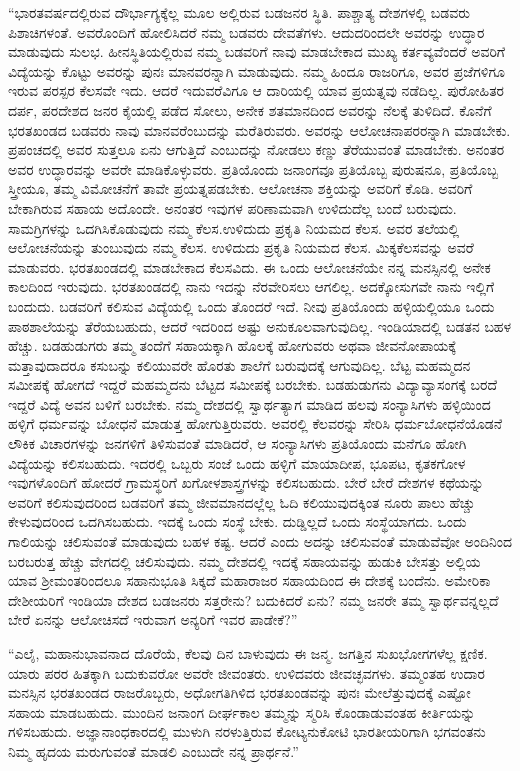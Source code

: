  “ಭಾರತವರ್ಷದಲ್ಲಿರುವ ದೌರ್ಭಾಗ್ಯಕ್ಕೆಲ್ಲ ಮೂಲ ಅಲ್ಲಿರುವ ಬಡಜನರ ಸ್ಥಿತಿ. ಪಾಶ್ಚಾತ್ಯ ದೇಶಗಳಲ್ಲಿ ಬಡವರು ಪಿಶಾಚಿಗಳಂತೆ. ಅವರೊಂದಿಗೆ ಹೋಲಿಸಿದರೆ ನಮ್ಮ ಬಡವರು ದೇವತೆಗಳು. ಆದುದರಿಂದಲೇ ಅವರನ್ನು ಉದ್ಧಾರ ಮಾಡುವುದು ಸುಲಭ. ಹೀನಸ್ಥಿತಿಯಲ್ಲಿರುವ ನಮ್ಮ ಬಡವರಿಗೆ ನಾವು ಮಾಡಬೇಕಾದ ಮುಖ್ಯ ಕರ್ತವ್ಯವೆಂದರೆ ಅವರಿಗೆ ವಿದ್ಯೆಯನ್ನು ಕೊಟ್ಟು ಅವರನ್ನು ಪುನಃ ಮಾನವರನ್ನಾಗಿ ಮಾಡುವುದು. ನಮ್ಮ ಹಿಂದೂ ರಾಜರಿಗೂ, ಅವರ ಪ್ರಜೆಗಳಿಗೂ ಇರುವ ಪರಸ್ಪರ ಕೆಲಸವೇ ಇದು. ಆದರೆ ಇದುವರೆವಿಗೂ ಆ ದಾರಿಯಲ್ಲಿ ಯಾವ ಪ್ರಯತ್ನವು ನಡೆದಿಲ್ಲ. ಪುರೋಹಿತರ ದರ್ಪ, ಪರದೇಶದ ಜನರ ಕೈಯಲ್ಲಿ ಪಡೆದ ಸೋಲು, ಅನೇಕ ಶತಮಾನದಿಂದ ಅವರನ್ನು ನೆಲಕ್ಕೆ ತುಳಿದಿದೆ. ಕೊನೆಗೆ ಭರತಖಂಡದ ಬಡವರು ನಾವು ಮಾನವರೆಂಬುದನ್ನು ಮರೆತಿರುವರು. ಅವರನ್ನು ಆಲೋಚನಾಪರರನ್ನಾಗಿ ಮಾಡಬೇಕು. ಪ್ರಪಂಚದಲ್ಲಿ ಅವರ ಸುತ್ತಲೂ ಏನು ಆಗುತ್ತಿದೆ ಎಂಬುದನ್ನು ನೋಡಲು ಕಣ್ಣು ತೆರೆಯುವಂತೆ ಮಾಡಬೇಕು. ಅನಂತರ ಅವರ ಉದ್ಧಾರವನ್ನು ಅವರೇ ಮಾಡಿಕೊಳ್ಳುವರು. ಪ್ರತಿಯೊಂದು ಜನಾಂಗವೂ ಪ್ರತಿಯೊಬ್ಬ ಪುರುಷನೂ, ಪ್ರತಿಯೊಬ್ಬ ಸ್ತ್ರೀಯೂ, ತಮ್ಮ ವಿಮೋಚನೆಗೆ ತಾವೇ ಪ್ರಯತ್ನಪಡಬೇಕು. ಆಲೋಚನಾ ಶಕ್ತಿಯನ್ನು ಅವರಿಗೆ ಕೊಡಿ. ಅವರಿಗೆ ಬೇಕಾಗಿರುವ ಸಹಾಯ ಅದೊಂದೇ. ಅನಂತರ ಇವುಗಳ ಪರಿಣಾಮವಾಗಿ ಉಳಿದುದೆಲ್ಲ ಬಂದೆ ಬರುವುದು. ಸಾಮಗ್ರಿಗಳನ್ನು ಒದಗಿಸಿಕೊಡುವುದು ನಮ್ಮ ಕೆಲಸ.\break ಉಳಿದುದು ಪ್ರಕೃತಿ ನಿಯಮದ ಕೆಲಸ. ಅವರ ತಲೆಯಲ್ಲಿ ಆಲೋಚನೆಯನ್ನು ತುಂಬುವುದು ನಮ್ಮ ಕೆಲಸ. ಉಳಿದುದು ಪ್ರಕೃತಿ ನಿಯಮದ ಕೆಲಸ. ಮಿಕ್ಕಕೆಲಸವನ್ನು ಅವರೆ ಮಾಡುವರು. ಭರತಖಂಡದಲ್ಲಿ ಮಾಡಬೇಕಾದ ಕೆಲಸವಿದು. ಈ ಒಂದು ಆಲೋಚನೆಯೇ ನನ್ನ ಮನಸ್ಸಿನಲ್ಲಿ ಅನೇಕ ಕಾಲದಿಂದ ಇರುವುದು. ಭರತಖಂಡದಲ್ಲಿ ನಾನು ಇದನ್ನು ನೆರವೇರಿಸಲು ಆಗಲಿಲ್ಲ. ಅದಕ್ಕೋಸುಗವೇ ನಾನು ಇಲ್ಲಿಗೆ ಬಂದುದು. ಬಡವರಿಗೆ ಕಲಿಸುವ ವಿದ್ಯೆಯಲ್ಲಿ ಒಂದು ತೊಂದರೆ ಇದೆ. ನೀವು ಪ್ರತಿಯೊಂದು ಹಳ್ಳಿಯಲ್ಲಿಯೂ ಒಂದು ಪಾಠಶಾಲೆಯನ್ನು ತೆರೆಯಬಹುದು, ಆದರೆ ಇದರಿಂದ ಅಷ್ಟು ಅನುಕೂಲವಾಗುವುದಿಲ್ಲ. ಇಂಡಿಯಾದಲ್ಲಿ ಬಡತನ ಬಹಳ ಹೆಚ್ಚು. ಬಡಹುಡುಗರು ತಮ್ಮ ತಂದೆಗೆ ಸಹಾಯಕ್ಕಾಗಿ ಹೊಲಕ್ಕೆ ಹೋಗುವರು ಅಥವಾ ಜೀವನೋಪಾಯಕ್ಕೆ ಮತ್ತಾವುದಾದರೂ ಕಸುಬನ್ನು ಕಲಿಯುವರೇ ಹೊರತು ಶಾಲೆಗೆ ಬರುವುದಕ್ಕೆ ಆಗುವುದಿಲ್ಲ. ಬೆಟ್ಟ ಮಹಮ್ಮದನ ಸಮೀಪಕ್ಕೆ ಹೋಗದೆ ಇದ್ದರೆ ಮಹಮ್ಮದನು ಬೆಟ್ಟದ ಸಮೀಪಕ್ಕೆ ಬರಬೇಕು. ಬಡಹುಡುಗನು ವಿದ್ಯಾವ್ಯಾಸಂಗಕ್ಕೆ ಬರದೆ ಇದ್ದರೆ ವಿದ್ಯೆ ಅವನ ಬಳಿಗೆ ಬರಬೇಕು. ನಮ್ಮ ದೇಶದಲ್ಲಿ ಸ್ವಾರ್ಥತ್ಯಾಗ ಮಾಡಿದ ಹಲವು ಸಂನ್ಯಾಸಿಗಳು ಹಳ್ಳಿಯಿಂದ ಹಳ್ಳಿಗೆ ಧರ್ಮವನ್ನು ಬೋಧನೆ ಮಾಡುತ್ತ ಹೋಗುತ್ತಿರುವರು. ಅವರಲ್ಲಿ ಕೆಲವರನ್ನು ಸೇರಿಸಿ ಧರ್ಮಬೋಧನೆಯೊಡನೆ ಲೌಕಿಕ ವಿಚಾರಗಳನ್ನು ಜನಗಳಿಗೆ ತಿಳಿಸುವಂತೆ ಮಾಡಿದರೆ, ಆ ಸಂನ್ಯಾಸಿಗಳು ಪ್ರತಿಯೊಂದು ಮನೆಗೂ ಹೋಗಿ ವಿದ್ಯೆಯನ್ನು ಕಲಿಸಬಹುದು. ಇದರಲ್ಲಿ ಒಬ್ಬರು ಸಂಜೆ ಒಂದು ಹಳ್ಳಿಗೆ ಮಾಯಾದೀಪ, ಭೂಪಟ, ಕೃತಕಗೋಳ ಇವುಗಳೊಂದಿಗೆ ಹೋದರೆ ಗ್ರಾಮಸ್ಥರಿಗೆ ಖಗೋಳಶಾಸ್ತ್ರಗಳನ್ನು ಕಲಿಸಬಹುದು. ಬೇರೆ ಬೇರೆ ದೇಶಗಳ ಕಥೆಯನ್ನು ಅವರಿಗೆ ಕಲಿಸುವುದರಿಂದ ಬಡವರಿಗೆ ತಮ್ಮ ಜೀವಮಾನದಲ್ಲೆಲ್ಲ ಓದಿ ಕಲಿಯುವುದಕ್ಕಿಂತ ನೂರು ಪಾಲು ಹೆಚ್ಚು ಕೇಳುವುದರಿಂದ ಒದಗಿಸಬಹುದು. ಇದಕ್ಕೆ ಒಂದು ಸಂಸ್ಥೆ ಬೇಕು. ದುಡ್ಡಿಲ್ಲದೆ ಒಂದು ಸಂಸ್ಥೆಯಾಗದು. ಒಂದು ಗಾಲಿಯನ್ನು ಚಲಿಸುವಂತೆ ಮಾಡುವುದು ಬಹಳ ಕಷ್ಟ. ಆದರೆ ಎಂದು ಅದನ್ನು ಚಲಿಸುವಂತೆ ಮಾಡುವೆವೋ ಅಂದಿನಿಂದ ಬರಬರುತ್ತ ಹೆಚ್ಚು ವೇಗದಲ್ಲಿ ಚಲಿಸುವುದು. ನಮ್ಮ ದೇಶದಲ್ಲಿ ಇದಕ್ಕೆ ಸಹಾಯವನ್ನು ಹುಡುಕಿ ಬೇಸತ್ತು ಅಲ್ಲಿಯ ಯಾವ ಶ‍್ರೀಮಂತರಿಂದಲೂ ಸಹಾನುಭೂತಿ ಸಿಕ್ಕದೆ ಮಹಾರಾಜರ ಸಹಾಯದಿಂದ ಈ ದೇಶಕ್ಕೆ ಬಂದೆನು. ಅಮೇರಿಕಾ ದೇಶೀಯರಿಗೆ ಇಂಡಿಯಾ ದೇಶದ ಬಡಜನರು ಸತ್ತರೇನು? ಬದುಕಿದರೆ ಏನು? ನಮ್ಮ ಜನರೇ ತಮ್ಮ ಸ್ವಾರ್ಥವನ್ನಲ್ಲದೆ ಬೇರೆ ಏನನ್ನು ಆಲೋಚಿಸದೆ ಇರುವಾಗ ಅನ್ಯರಿಗೆ ಇವರ ಪಾಡೇಕೆ?” 

 “ಎಲೈ, ಮಹಾನುಭಾವನಾದ ದೊರೆಯೆ, ಕೆಲವು ದಿನ ಬಾಳುವುದು ಈ ಜನ್ಮ. ಜಗತ್ತಿನ ಸುಖಭೋಗಗಳೆಲ್ಲ ಕ್ಷಣಿಕ. ಯಾರು ಪರರ ಹಿತಕ್ಕಾಗಿ ಬದುಕುವರೋ ಅವರೇ ಜೀವಂತರು. ಉಳಿದವರು ಜೀವಚ್ಛವಗಳು. ತಮ್ಮಂತಹ ಉದಾರ ಮನಸ್ಸಿನ ಭರತಖಂಡದ ರಾಜರೊಬ್ಬರು, ಅಧೋಗತಿಗಿಳಿದ ಭರತಖಂಡವನ್ನು ಪುನಃ ಮೇಲೆತ್ತುವುದಕ್ಕೆ ಎಷ್ಟೋ ಸಹಾಯ ಮಾಡಬಹುದು. ಮುಂದಿನ ಜನಾಂಗ ದೀರ್ಘಕಾಲ ತಮ್ಮನ್ನು ಸ್ಮರಿಸಿ ಕೊಂಡಾಡುವಂತಹ ಕೀರ್ತಿಯನ್ನು ಗಳಿಸಬಹುದು. ಅಜ್ಞಾನಾಂಧಕಾರದಲ್ಲಿ ಮುಳುಗಿ ನರಳುತ್ತಿರುವ ಕೋಟ್ಯನುಕೋಟಿ ಭಾರತೀಯರಿಗಾಗಿ ಭಗವಂತನು ನಿಮ್ಮ ಹೃದಯ ಮರುಗುವಂತೆ ಮಾಡಲಿ ಎಂಬುದೇ ನನ್ನ ಪ್ರಾರ್ಥನೆ.” 

